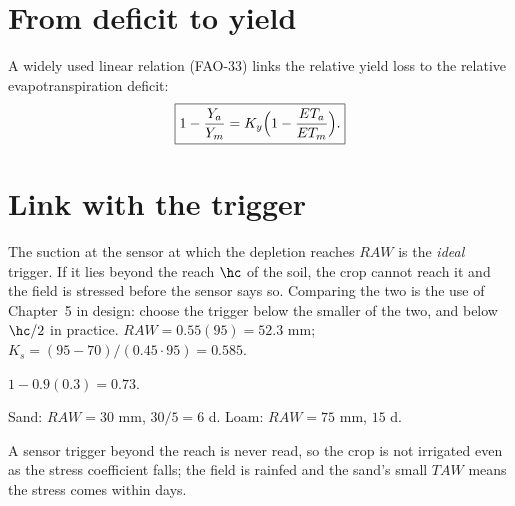 \section{From deficit to yield}
A widely used linear relation (FAO-33) links the relative yield loss to the relative evapotranspiration deficit:
\begin{equation}\label{eq:Ky}\boxed{1-\frac{Y_a}{Y_m}=K_y\Bigl(1-\frac{ET_a}{ET_m}\Bigr).}\end{equation}



\section{Link with the trigger}
The suction at the sensor at which the depletion reaches $RAW$ is the \emph{ideal} trigger. If it lies beyond the reach $\hc$ of the soil, the crop cannot reach it and the field is stressed before the sensor says so. Comparing the two is the use of Chapter~5 in design: choose the trigger below the smaller of the two, and below $\hc/2$ in practice.
\sol  $RAW=0.55(95)=52.3$ mm; $K_s=(95-70)/(0.45\cdot95)=0.585$.

\sol  $1-0.9(0.3)=0.73$.

\sol  Sand: $RAW=30$ mm, $30/5=6$ d. Loam: $RAW=75$ mm, $15$ d.

\sol  A sensor trigger beyond the reach is never read, so the crop is not irrigated even as the stress coefficient falls; the field is rainfed and the sand's small $TAW$ means the stress comes within days.

